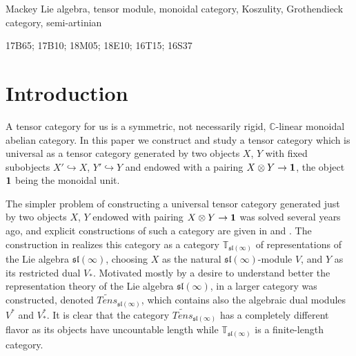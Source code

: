 \documentclass[11pt]{article}
\theoremstyle{plain}
\theoremstyle{nonumberplain}
\theoremstyle{plain}
\numberwithin{equation}{section}
\theoremstyle{nonumberplain}
\newcommand\bT{{\mathbb T}}
\newcommand\fsl{\mathfrak{sl}}
\newcommand\1{{\bf 1}}
\begin{document}
 Mackey Lie algebra, tensor module, monoidal category, Koszulity, Grothendieck category, semi-artinian



\vspace{.5cm}


17B65; 17B10; 18M05; 18E10; 16T15; 16S37

\tableofcontents


\section{Introduction}


A tensor category for us is a symmetric, not necessarily rigid, $\mathbb{C}$-linear monoidal abelian category. In this paper we construct and study a tensor category which is universal as a tensor category generated by two objects $X$, $Y$ with fixed subobjects $X'\hookrightarrow X$, $Y'\hookrightarrow Y$ and endowed with a pairing $X\otimes Y\rightarrow {\bf 1}$, the object ${\bf 1}$ being the monoidal unit.

The simpler problem of constructing a universal tensor category generated just by two objects $X$, $Y$ endowed with pairing $X\otimes Y\rightarrow {\bf 1}$ was solved several years ago, and explicit constructions of such a category are given in \cite{SS} and \cite{DPS}. The construction in \cite{DPS} realizes this category as a category $\bT_{\fsl(\infty)}$ of representations of the Lie algebra $\fsl(\infty)$, choosing $X$ as the natural $\fsl(\infty)$-module $V$, and $Y$ as its restricted dual $V_*$. Motivated mostly by a desire to understand better the representation theory of the Lie algebra $\fsl(\infty)$, in \cite{PS1} a larger category was constructed, denoted $\widetilde{Tens}_{\fsl(\infty)}$, which contains also the algebraic dual modules $V^*$ and $V_*^*$. It is clear that the category $\widetilde{Tens}_{\fsl(\infty)}$ has a completely different flavor as its objects have uncountable length while $\bT_{\fsl(\infty)}$ is a finite-length category.
\end{document}
